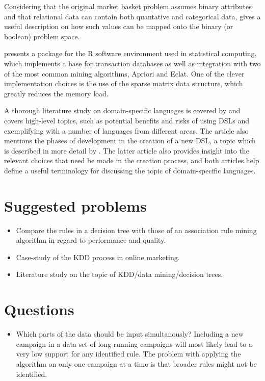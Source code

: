 \documentclass[a4paper]{article}
\begin{document}
Considering that the original market basket problem assumes binary attributes and that relational data can contain both
quantative and categorical data, \citep{Srikant1996} gives a useful description on how such values can be mapped onto the
binary (or boolean) problem space.

\citet{Hahsler2007} presents a package for the R software environment used in statistical computing, which implements a base
for transaction databases as well as integration with two of the most common mining algorithms, Apriori and Eclat. One of the
clever implementation choices is the use of the sparse matrix data structure, which greatly reduces the memory load.

A thorough literature study on domain-specific languages is covered by \citet{Deursen2000} and covers high-level topics, such as
potential benefits and risks of using DSLs and exemplifying with a number of languages from different areas. The article also
mentions the phases of development in the creation of a new DSL, a topic which is described in more detail by \citet{Mernik2005}.
The latter article also provides insight into the relevant choices that need be made in the creation process, and both articles
help define a useful terminology for discussing the topic of domain-specific languages.

\section{Suggested problems}
\begin{itemize}
	\item Compare the rules in a decision tree with those of an association rule mining algorithm in regard to performance and
			quality.
	\item Case-study of the KDD process in online marketing.
	\item Literature study on the topic of KDD/data mining/decision trees.
\end{itemize}

\section{Questions}
\begin{itemize}
	\item Which parts of the data should be input simultanously? Including a new campaign in a data set of long-running
		campaigns will most likely lead to a very low support for any identified rule. The problem with applying the algorithm
		on only one campaign at a time is that broader rules might not be identified.
\end{itemize}
\end{document}
